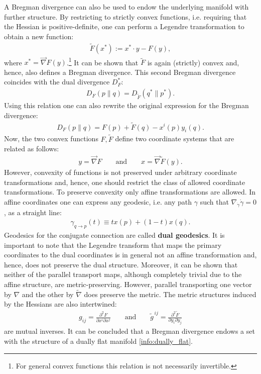     A Bregman divergence can also be used to endow the underlying manifold with further structure. By restricting to strictly convex functions, i.e. requiring that the Hessian is positive-definite, one can perform a Legendre transformation to obtain a new function:
    \begin{gather}
        \label{info:legendre}
        \widetilde{F}(x^*) := x^*\cdot y - F(y),
    \end{gather}
    where $x^*=\vec{\nabla}F(y)$.\footnote{For general convex functions this relation is not necessarily invertible.} It can be shown that $\widetilde{F}$ is again (strictly) convex and, hence, also defines a Bregman divergence. This second Bregman divergence coincides with the dual divergence $D_F^*$:
    \begin{gather}
        D_F(p\|q) = D_{\widetilde{F}}(q^*\|p^*).
    \end{gather}
    Using this relation one can also rewrite the original expression for the Bregman divergence:
    \begin{gather}
        D_F(p\|q) = F(p) + \widetilde{F}(q) - x^i(p)y_i(q).
    \end{gather}
    Now, the two convex functions $F,\widetilde{F}$ define two coordinate systems that are related as follows:
    \begin{gather}
        y=\vec{\nabla}F\qquad\text{and}\qquad x=\vec{\nabla}\widetilde{F}(y).
    \end{gather}
    However, convexity of functions is not preserved under arbitrary coordinate transformations and, hence, one should restrict the class of allowed coordinate transformations. To preserve convexity only affine transformations are allowed. In affine coordinates one can express any geodesic, i.e. any path $\gamma$ such that $\nabla_{\dot{\gamma}}\dot{\gamma}=0$, as a straight line:
    \begin{gather}
        \gamma_{q\rightarrow p}(t) \equiv tx(p) + (1-t)x(q).
    \end{gather}
    Geodesics for the conjugate connection are called \textbf{dual geodesics}. It is important to note that the Legendre transform that maps the primary coordinates to the dual coordinates is in general not an affine transformation and, hence, does not preserve the dual structure. Moreover, it can be shown that neither of the parallel transport maps, although completely trivial due to the affine structure, are metric-preserving. However, parallel transporting one vector by $\nabla$ and the other by $\widetilde{\nabla}$ does preserve the metric. The metric structures induced by the Hessians are also intertwined:
    \begin{gather}
        \label{info:bregman_metric}
        g_{ij} = \frac{\partial^2F}{\partial x^i\partial x^j}\qquad\text{and}\qquad \widetilde{g}^{\,ij} = \frac{\partial^2\widetilde{F}}{\partial y_i\partial y_j}
    \end{gather}
    are mutual inverses. It can be concluded that a Bregman divergence endows a set with the structure of a dually flat manifold \ref{info:dually_flat}.

